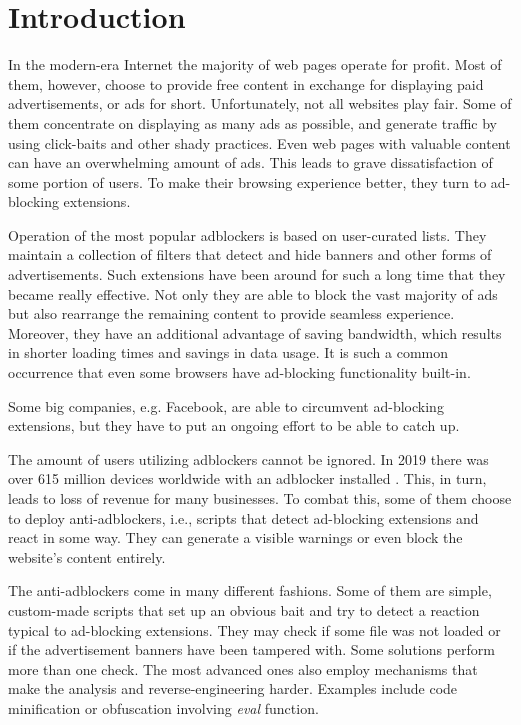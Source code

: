 \chapter*{Introduction}

In the modern-era Internet the majority of web pages operate for profit. Most of them, however, choose to provide free content
in exchange for displaying paid advertisements, or ads for short. Unfortunately, not all websites play fair. Some of them
concentrate on displaying as many ads as possible, and generate traffic by using click-baits 
and other shady practices. Even web pages with valuable content can have an overwhelming amount 
of ads. This leads to grave dissatisfaction of some portion of users. To make their browsing experience better,
they turn to ad-blocking extensions.

Operation of the most popular adblockers is based on user-curated lists. They maintain a collection
of filters that detect and hide banners and other forms of advertisements.
Such extensions have been around for such a long time that they became really effective. 
Not only they are able to block the vast majority of ads
but also rearrange the remaining content to provide seamless experience.
Moreover, they have an additional advantage of saving bandwidth, which results in shorter
loading times and savings in data usage.
It is such a common occurrence that even some browsers have ad-blocking
functionality built-in.

Some big companies, e.g. Facebook, are able to circumvent ad-blocking extensions,
but they have to put an ongoing effort to be able to catch up.

The amount of users utilizing adblockers cannot be ignored. In 2019 there was over 615 million devices worldwide
with an adblocker installed \cite{pagefair:adblock-report}. This, in turn, leads to loss of revenue for many businesses.
To combat this, some of them choose to deploy anti-adblockers, i.e., scripts that detect ad-blocking extensions
and react in some way. They can generate a visible warnings or even block the website's content entirely.

The anti-adblockers come in many different fashions. Some of them are simple, custom-made scripts that 
set up an obvious bait and try to detect a reaction typical to ad-blocking extensions.
They may check if some file was not loaded or if the advertisement banners have been tampered with.
Some solutions perform more than one check. The most advanced ones also employ mechanisms that
make the analysis and reverse-engineering harder. Examples include code minification
or obfuscation involving \emph{eval} function.

